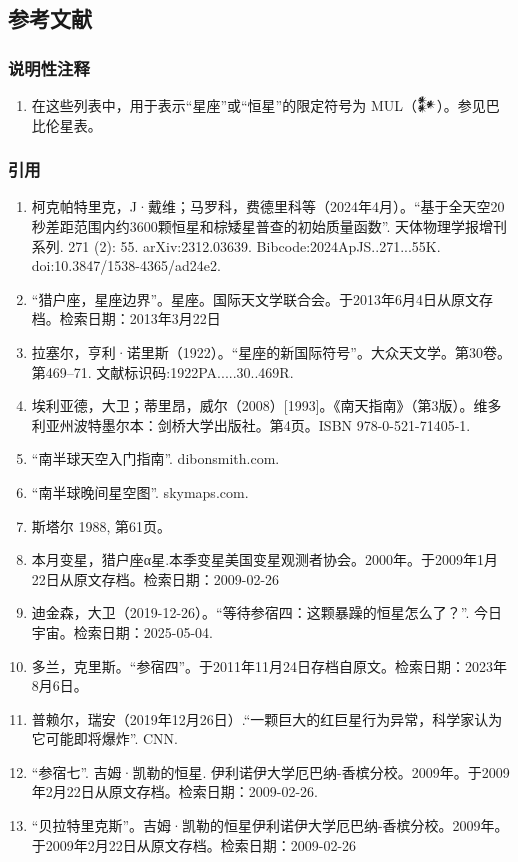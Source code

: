 \subsection{参考文献}  
\subsubsection{说明性注释}  
\begin{enumerate}
\item 在这些列表中，用于表示“星座”或“恒星”的限定符号为 MUL（𒀯）。参见巴比伦星表。
\end{enumerate}
\subsubsection{引用}
\begin{enumerate}
\item 柯克帕特里克，J·戴维；马罗科，费德里科等（2024年4月）。“基于全天空20秒差距范围内约3600颗恒星和棕矮星普查的初始质量函数”. 天体物理学报增刊系列. 271 (2): 55. arXiv:2312.03639. Bibcode:2024ApJS..271...55K. doi:10.3847/1538-4365/ad24e2.
\item “猎户座，星座边界”。星座。国际天文学联合会。于2013年6月4日从原文存档。检索日期：2013年3月22日
\item 拉塞尔，亨利·诺里斯（1922）。“星座的新国际符号”。大众天文学。第30卷。第469–71. 文献标识码:1922PA.....30..469R.
\item 埃利亚德，大卫；蒂里昂，威尔（2008）[1993]。《南天指南》（第3版）。维多利亚州波特墨尔本：剑桥大学出版社。第4页。ISBN 978-0-521-71405-1.
\item “南半球天空入门指南”. dibonsmith.com.
\item “南半球晚间星空图”. skymaps.com.
\item 斯塔尔 1988, 第61页。
\item 本月变星，猎户座α星.本季变星美国变星观测者协会。2000年。于2009年1月22日从原文存档。检索日期：2009-02-26
\item 迪金森，大卫（2019-12-26）。“等待参宿四：这颗暴躁的恒星怎么了？”. 今日宇宙。检索日期：2025-05-04.
\item 多兰，克里斯。“参宿四”。于2011年11月24日存档自原文。检索日期：2023年8月6日。
\item 普赖尔，瑞安（2019年12月26日）.“一颗巨大的红巨星行为异常，科学家认为它可能即将爆炸”. CNN.
\item “参宿七”. 吉姆·凯勒的恒星. 伊利诺伊大学厄巴纳-香槟分校。2009年。于2009年2月22日从原文存档。检索日期：2009-02-26.
\item “贝拉特里克斯”。吉姆·凯勒的恒星伊利诺伊大学厄巴纳-香槟分校。2009年。于2009年2月22日从原文存档。检索日期：2009-02-26

\end{enumerate}
